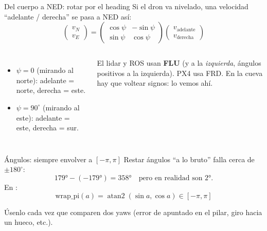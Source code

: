 \begin{frame}{Del cuerpo a NED: rotar por el heading}
  \small Si el dron va nivelado, una velocidad ``adelante / derecha'' se pasa a NED así:
  \[
    \begin{pmatrix} v_N \\ v_E \end{pmatrix} =
    \begin{pmatrix} \cos\psi & -\sin\psi \\ \sin\psi & \cos\psi \end{pmatrix}
    \begin{pmatrix} v_{\text{adelante}} \\ v_{\text{derecha}} \end{pmatrix}
  \]
  \begin{columns}[c]
    \begin{itemize}
      \item $\psi = 0$ (mirando al norte): adelante = norte, derecha = este.
      \item $\psi = 90^\circ$ (mirando al este): adelante = este, derecha = sur.
    \end{itemize}
    \begin{ojo}
      \small El lidar y ROS usan \textbf{FLU} (y a la \emph{izquierda}, ángulos positivos
      a la izquierda). PX4 usa FRD. En la cueva hay que voltear signos: lo vemos ahí.
    \end{ojo}
  \end{columns}
\end{frame}

\begin{frame}{Ángulos: siempre envolver a $[-\pi, \pi]$}
  \small Restar ángulos ``a lo bruto'' falla cerca de $\pm180^\circ$:
  \[ 179° - (-179°) = 358° \quad\text{pero en realidad son } 2°. \]
  En :
  \[ \text{wrap\_pi}(a) = \operatorname{atan2}(\sin a, \cos a) \in [-\pi, \pi] \]
  \begin{idea}
    \small Úsenlo cada vez que comparen dos yaws (error de apuntado en el pilar, giro hacia un hueco, etc.).
  \end{idea}
\end{frame}

